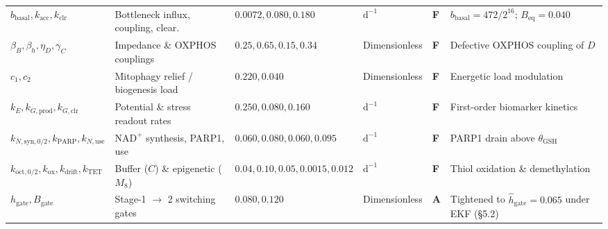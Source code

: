 \documentclass[11pt]{article}
\theoremstyle{plain}
\theoremstyle{remark}
\begin{document}
\begin{table}[t]
{\begin{tabular}{@{}llllll@{}}
$b_{\mathrm{basal}}, k_{\mathrm{acc}}, k_{\mathrm{clr}}$ & Bottleneck influx, coupling, clear. & $0.0072, 0.080, 0.180$ & $\text{d}^{-1}$ & \textbf{F} & $b_{\mathrm{basal}} = 472/2^{16}$; $B_{\mathrm{eq}} = 0.040$ \\
$\beta_B, \beta_h, \eta_D, \gamma_C$ & Impedance \& OXPHOS couplings & $0.25, 0.65, 0.15, 0.34$ & Dimensionless & \textbf{F} & Defective OXPHOS coupling of $D$ \cite{wallace2012mitochondrial} \\
$c_1, c_2$ & Mitophagy relief / biogenesis load & $0.220, 0.040$ & Dimensionless & \textbf{F} & Energetic load modulation \\
$k_E, k_{G,\mathrm{prod}}, k_{G,\mathrm{clr}}$ & Potential \& stress readout rates & $0.250, 0.080, 0.160$ & $\text{d}^{-1}$ & \textbf{F} & First-order biomarker kinetics \\
$k_{N,\mathrm{syn},0/2}, k_{\mathrm{PARP}}, k_{N,\mathrm{use}}$ & $\text{NAD}^+$ synthesis, PARP1, use & $0.060, 0.080, 0.060, 0.095$ & $\text{d}^{-1}$ & \textbf{F} & PARP1 drain above $\theta_{\mathrm{GSH}}$ \cite{ryu2016urolithin} \\
$k_{\mathrm{oct},0/2}, k_{\mathrm{ox}}, k_{\mathrm{drift}}, k_{\mathrm{TET}}$ & Buffer ($C$) \& epigenetic ($M_8$) & $0.04, 0.10, 0.05, 0.0015, 0.012$ & $\text{d}^{-1}$ & \textbf{F} & Thiol oxidation \& demethylation \\
$h_{\mathrm{gate}}, B_{\mathrm{gate}}$ & Stage-1 $\to$ 2 switching gates & $0.080, 0.120$ & Dimensionless & \textbf{A} & Tightened to $\hat{h}_{\mathrm{gate}}=0.065$ under EKF (\S5.2) \\
\bottomrule
\end{tabular}%
}
\end{table}
\end{document}
